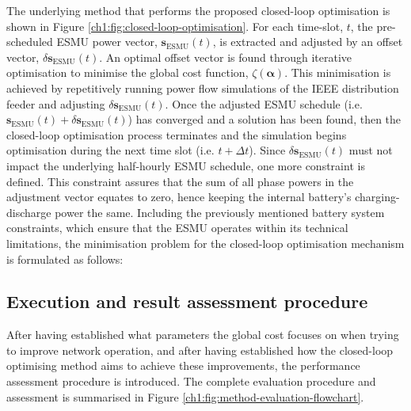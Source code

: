 


The underlying method that performs the proposed closed-loop optimisation is shown in Figure \ref{ch1:fig:closed-loop-optimisation}.
For each time-slot, $t$, the pre-scheduled ESMU power vector, $\textbf{s}_\text{ESMU}(t)$, is extracted and adjusted by an offset vector, $\delta \textbf{s}_\text{ESMU}(t)$.
An optimal offset vector is found through iterative optimisation to minimise the global cost function, $\zeta(\boldsymbol{\alpha})$.
This minimisation is achieved by repetitively running power flow simulations of the IEEE distribution feeder and adjusting $\delta\textbf{s}_\text{ESMU}(t)$.
Once the adjusted ESMU schedule (i.e. $\textbf{s}_\text{ESMU}(t) + \delta \textbf{s}_\text{ESMU}(t)$) has converged and a solution has been found, then the closed-loop optimisation process terminates and the simulation begins optimisation during the next time slot (i.e. $t+\Delta t$).
Since $\delta \textbf{s}_\text{ESMU}(t)$ must not impact the underlying half-hourly ESMU schedule, one more constraint is defined.
This constraint assures that the sum of all phase powers in the adjustment vector equates to zero, hence keeping the internal battery's charging-discharge power the same.
Including the previously mentioned battery system constraints, which ensure that the ESMU operates within its technical limitations, the minimisation problem for the closed-loop optimisation mechanism is formulated as follows:



\subsection{Execution and result assessment procedure}
\label{ch1:subsec:method-execution}

After having established what parameters the global cost focuses on when trying to improve network operation, and after having established how the closed-loop optimising method aims to achieve these improvements, the performance assessment procedure is introduced.
The complete evaluation procedure and assessment is summarised in Figure \ref{ch1:fig:method-evaluation-flowchart}.

